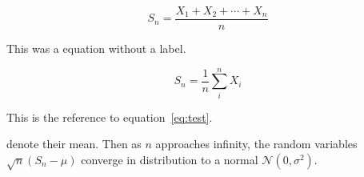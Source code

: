 $$S_n = \frac{X_1 + X_2 + \cdots + X_n}{n}$$

This was a equation without a label.
      
\begin{equation}
S_n = \frac{1}{n}\sum_{i}^{n} X_i
\label{eq:test}
\end{equation}

This is the reference to equation~\ref{eq:test}.      

denote their mean. Then as $n$ approaches infinity, the random variables $\sqrt{n}(S_n - \mu)$ converge in distribution to a normal $\mathcal{N}(0, \sigma^2)$.


